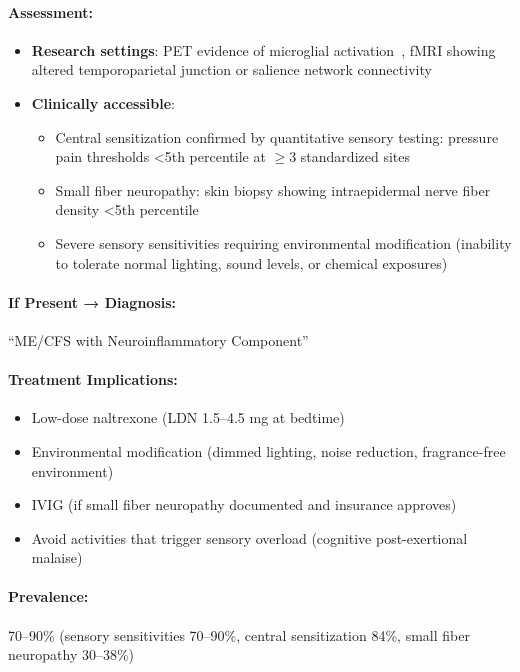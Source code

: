 \paragraph{Assessment:}
\begin{itemize}
    \item \textbf{Research settings}: PET evidence of microglial activation~\cite{Nakatomi2014neuroinflammation}, fMRI showing altered temporoparietal junction or salience network connectivity~\cite{walitt2024deep,Shan2020neuroimaging}
    \item \textbf{Clinically accessible}:
    \begin{itemize}
        \item Central sensitization confirmed by quantitative sensory testing: pressure pain thresholds <5th percentile at $\geq$3 standardized sites~\cite{Nijs2021sensitization}
        \item Small fiber neuropathy: skin biopsy showing intraepidermal nerve fiber density <5th percentile~\cite{Oaklander2022SFN}
        \item Severe sensory sensitivities requiring environmental modification (inability to tolerate normal lighting, sound levels, or chemical exposures)
    \end{itemize}
\end{itemize}

\paragraph{If Present → Diagnosis:} ``ME/CFS with Neuroinflammatory Component''

\paragraph{Treatment Implications:}
\begin{itemize}
    \item Low-dose naltrexone (LDN 1.5--4.5 mg at bedtime)
    \item Environmental modification (dimmed lighting, noise reduction, fragrance-free environment)
    \item IVIG (if small fiber neuropathy documented and insurance approves)
    \item Avoid activities that trigger sensory overload (cognitive post-exertional malaise)
\end{itemize}

\paragraph{Prevalence:} 70--90\% (sensory sensitivities 70--90\%, central sensitization 84\%, small fiber neuropathy 30--38\%)

